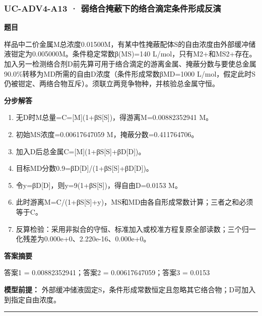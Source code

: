 \documentclass[UTF8,11pt,a4paper]{ctexart}
\begin{document}
\subsubsection*{UC-ADV4-A13 · 弱络合掩蔽下的络合滴定条件形成反演}
\noindent\textbf{题目}\par
样品中二价金属M总浓度0.01500M，有某中性掩蔽配体S的自由浓度由外部缓冲储液钳定为0.005000M。条件稳定常数β(MS)=140 L/mol，只有M2+和MS2+存在。加入另一检测络合剂D前先算可用于络合滴定的游离金属、掩蔽分数与要使总金属90.0\%转移为MD所需的自由D浓度（条件形成常数βMD=1000 L/mol，假定此时S仍被钳定、两络合物互斥）。须联立两竞争物种，并核验总金属守恒。\par
\medskip\noindent\textbf{分步解答}
\begin{enumerate}
\item 无D时M总量=C=[M](1+βS[S])，得游离M=0.00882352941 M。
\item 初始MS浓度=0.00617647059 M，掩蔽分数=0.411764706。
\item 加入D后总金属C=[M](1+βS[S]+βD[D])。
\item 目标MD分数0.9=βD[D]/(1+βS[S]+βD[D])。
\item 令y=βD[D]，则y=9(1+βS[S])，得自由D=0.0153 M。
\item 此时游离M=C/(1+βS[S]+y)，MS和MD由各自形成常数计算；三者之和必须等于C。
\item 反算检验：采用非拟合的守恒、标准加入或校准方程复原全部读数；三个归一化残差为0.000e+0、2.220e-16、0.000e+0。
\end{enumerate}
\noindent\textbf{答案摘要}\par
答案1 = 0.00882352941；答案2 = 0.00617647059；答案3 = 0.0153\par
\noindent\textbf{模型前提：}
外部缓冲储液固定S，条件形成常数恒定且忽略其它络合物；D可加入到指定自由浓度。\par
\medskip\hrule\medskip
{}
\end{document}
